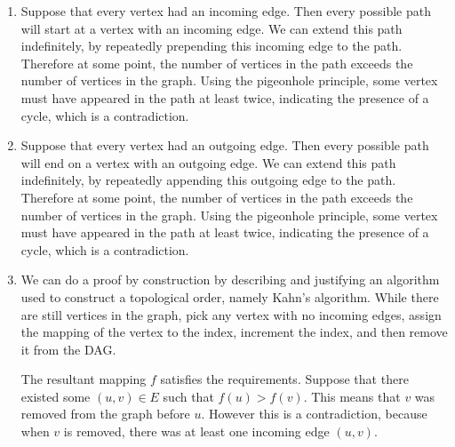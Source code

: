 \documentclass{article}
\begin{document}
\begin{solution}
\begin{enumerate}[label = (\alph*)]
    
    \item Suppose that every vertex had an incoming edge. Then every possible path will start at a vertex with an incoming edge.
    We can extend this path indefinitely, by repeatedly prepending this incoming edge to the path. 
    Therefore at some point, the number of vertices in the path exceeds the number of vertices in the graph.
    Using the pigeonhole principle, some vertex must have appeared in the path at least twice, indicating the presence of a cycle, which is a contradiction.

    \item Suppose that every vertex had an outgoing edge. Then every possible path will end on a vertex with an outgoing edge.
    We can extend this path indefinitely, by repeatedly appending this outgoing edge to the path. 
    Therefore at some point, the number of vertices in the path exceeds the number of vertices in the graph.
    Using the pigeonhole principle, some vertex must have appeared in the path at least twice, indicating the presence of a cycle, which is a contradiction.

    \item We can do a proof by construction by describing and justifying an algorithm used to construct a topological order, namely Kahn's algorithm.
    While there are still vertices in the graph, pick any vertex with no incoming edges, assign the mapping of the vertex to the index, increment the index, and then remove it from the DAG.
    
    The resultant mapping $f$ satisfies the requirements. Suppose that there existed some $(u,v)\in E$ such that $f(u)>f(v)$.
    This means that $v$ was removed from the graph before $u$. However this is a contradiction, because when $v$ is removed,
    there was at least one incoming edge $(u, v)$.


\end{enumerate}
\end{solution}
\end{document}
